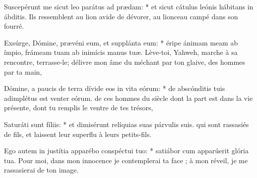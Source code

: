 \begin{paracol}{2}
\LigneParacol
{Suscepérunt me sicut leo parátus ad prædam: * et sicut cátulus leónis hábitans in ábditis.}
{Ils ressemblent au lion avide de dévorer, au lionceau campé dans son fourré. }

\LigneParacol
{Exsúrge, Dómine, prævéni eum, et supplánta eum: * éripe ánimam meam ab ímpio, frámeam tuam ab inimícis manus tuæ.}
{Lève-toi, Yahweh, marche à sa rencontre, terrasse-le; délivre mon âme du méchant par ton glaive, des hommes par ta main,}

\LigneParacol
{Dómine, a paucis de terra dívide eos in vita eórum: * de abscónditis tuis adimplétus est venter eórum.}
{de ces hommes du siècle dont la part est dans la vie présente, dont tu remplis le ventre de tes trésors,}

\LigneParacol
{Saturáti sunt fíliis: * et dimisérunt relíquias suas párvulis suis.}
{qui sont rassasiés de fils, et laissent leur superflu à leurs petits-fils. }

\LigneParacol
{Ego autem in justítia apparébo conspéctui tuo: * satiábor cum apparúerit glória tua.}
{Pour moi, dans mon innocence je contemplerai ta face ; à mon réveil, je me rassasierai de ton image. }

\end{paracol}
